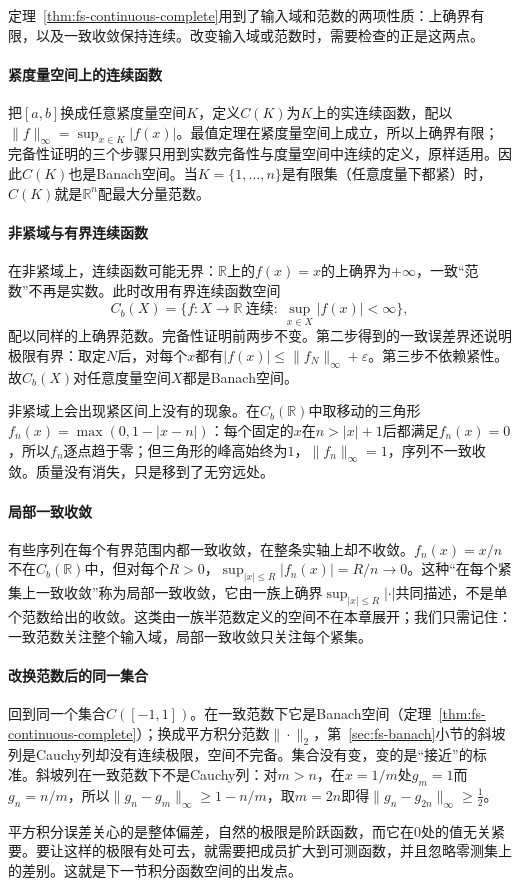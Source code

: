 定理~\ref{thm:fs-continuous-complete}用到了输入域和范数的两项性质：上确界有限，以及一致收敛保持连续。改变输入域或范数时，需要检查的正是这两点。

\paragraph{紧度量空间上的连续函数}
把$[a,b]$换成任意紧度量空间$K$，定义$C(K)$为$K$上的实连续函数，配以$\|f\|_\infty=\sup_{x\in K}|f(x)|$。最值定理在紧度量空间上成立，所以上确界有限；完备性证明的三个步骤只用到实数完备性与度量空间中连续的定义，原样适用。因此$C(K)$也是Banach空间。当$K=\{1,\ldots,n\}$是有限集（任意度量下都紧）时，$C(K)$就是$\mathbb R^n$配最大分量范数。

\paragraph{非紧域与有界连续函数}
在非紧域上，连续函数可能无界：$\mathbb R$上的$f(x)=x$的上确界为$+\infty$，一致“范数”不再是实数。此时改用有界连续函数空间
\[
 C_b(X)=\{f:X\to\mathbb R\ \text{连续}:\ \sup_{x\in X}|f(x)|<\infty\},
\]
配以同样的上确界范数。完备性证明前两步不变。第二步得到的一致误差界还说明极限有界：取定$N$后，对每个$x$都有$|f(x)|\leq\|f_N\|_\infty+\varepsilon$。第三步不依赖紧性。故$C_b(X)$对任意度量空间$X$都是Banach空间。

非紧域上会出现紧区间上没有的现象。在$C_b(\mathbb R)$中取移动的三角形$f_n(x)=\max(0,1-|x-n|)$：每个固定的$x$在$n>|x|+1$后都满足$f_n(x)=0$，所以$f_n$逐点趋于零；但三角形的峰高始终为$1$，$\|f_n\|_\infty=1$，序列不一致收敛。质量没有消失，只是移到了无穷远处。

\paragraph{局部一致收敛}
有些序列在每个有界范围内都一致收敛，在整条实轴上却不收敛。$f_n(x)=x/n$不在$C_b(\mathbb R)$中，但对每个$R>0$，$\sup_{|x|\leq R}|f_n(x)|=R/n\to0$。这种“在每个紧集上一致收敛”称为局部一致收敛，它由一族上确界$\sup_{|x|\leq R}|\cdot|$共同描述，不是单个范数给出的收敛。这类由一族半范数定义的空间不在本章展开；我们只需记住：一致范数关注整个输入域，局部一致收敛只关注每个紧集。

\paragraph{改换范数后的同一集合}
回到同一个集合$C([-1,1])$。在一致范数下它是Banach空间（定理~\ref{thm:fs-continuous-complete}）；换成平方积分范数$\|\cdot\|_2$，第~\ref{sec:fs-banach}小节的斜坡列是Cauchy列却没有连续极限，空间不完备。集合没有变，变的是“接近”的标准。斜坡列在一致范数下不是Cauchy列：对$m>n$，在$x=1/m$处$g_m=1$而$g_n=n/m$，所以$\|g_n-g_m\|_\infty\geq1-n/m$，取$m=2n$即得$\|g_n-g_{2n}\|_\infty\geq\tfrac12$。

平方积分误差关心的是整体偏差，自然的极限是阶跃函数，而它在$0$处的值无关紧要。要让这样的极限有处可去，就需要把成员扩大到可测函数，并且忽略零测集上的差别。这就是下一节积分函数空间的出发点。
